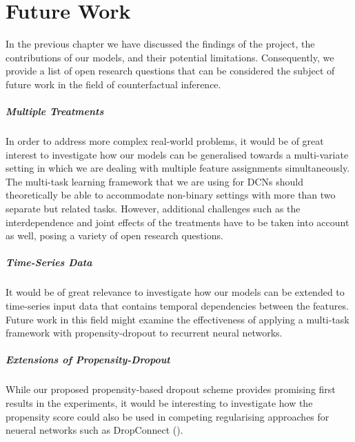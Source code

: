 %

\chapter{\label{ch:7-future-work}Future Work} 
In the previous chapter we have discussed the findings of the project, the contributions of our models, and their potential limitations. Consequently, we provide a list of open research questions that can be considered the subject of future work in the field of counterfactual inference. 

\paragraph{Multiple Treatments} In order to address more complex real-world problems, it would be of great interest to investigate how our models can be generalised towards a multi-variate setting in which we are dealing with multiple feature assignments simultaneously. The multi-task learning framework that we are using for DCNs should theoretically be able to accommodate non-binary settings with more than two separate but related tasks. However, additional challenges such as the interdependence and joint effects of the treatments have to be taken into account as well, posing a variety of open research questions. 

\paragraph{Time-Series Data} It would be of great relevance to investigate how our models can be extended to time-series input data that contains temporal dependencies between the features. Future work in this field might examine the effectiveness of applying a multi-task framework with propensity-dropout to recurrent neural networks. 

\paragraph{Extensions of Propensity-Dropout} While our proposed propensity-based dropout scheme provides promising first results in the experiments, it would be interesting to investigate how the propensity score could also be used in competing regularising approaches for neueral networks  such as DropConnect (\cite{dropconnect}).

